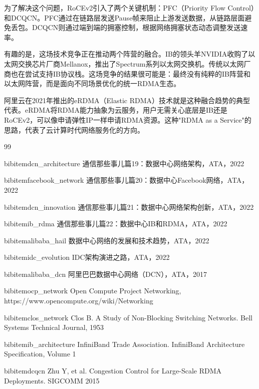 为了解决这个问题，RoCEv2引入了两个关键机制：PFC（Priority Flow Control）和DCQCN。PFC通过在链路层发送Pause帧来阻止上游发送数据，从链路层面避免丢包。DCQCN则通过端到端的拥塞控制，根据网络拥塞状态动态调整发送速率。

有趣的是，这场技术竞争正在推动两个阵营的融合。IB的领头羊NVIDIA收购了以太网交换芯片厂商Mellanox，推出了Spectrum系列以太网交换机。传统以太网厂商也在尝试支持IB协议栈。这场竞争的结果很可能是：最终没有纯粹的IB阵营和以太网阵营，而是面向不同场景优化的统一RDMA生态。

阿里云在2021年推出的eRDMA（Elastic RDMA）技术就是这种融合趋势的典型代表。eRDMA将RDMA能力抽象为云服务，用户无需关心底层是IB还是RoCEv2，可以像申请弹性IP一样申请RDMA资源。这种"RDMA as a Service"的思路，代表了云计算时代网络服务化的方向。

\begin{thebibliography}{99}

bibitem{dcn_architecture}
通信那些事儿篇19：数据中心网络架构，ATA，2022

bibitem{facebook_network}
通信那些事儿篇20：数据中心Facebook网络，ATA，2022

bibitem{dcn_innovation}
通信那些事儿篇21：数据中心网络架构创新，ATA，2022

bibitem{ib_rdma}
通信那些事儿篇22：数据中心IB和RDMA，ATA，2022

bibitem{alibaba_hail}
数据中心网络的发展和技术趋势，ATA，2022

bibitem{idc_evolution}
IDC架构演进之路，ATA，2022

bibitem{alibaba_dcn}
阿里巴巴数据中心网络（DCN），ATA，2017

bibitem{ocp_network}
Open Compute Project Networking,
https://www.opencompute.org/wiki/Networking

bibitem{clos_network}
Clos B. A Study of Non-Blocking Switching Networks.
Bell Systems Technical Journal, 1953

bibitem{ib_architecture}
InfiniBand Trade Association.
InfiniBand Architecture Specification, Volume 1

bibitem{dcqcn}
Zhu Y, et al.
Congestion Control for Large-Scale RDMA Deployments.
SIGCOMM 2015

\end{thebibliography}
